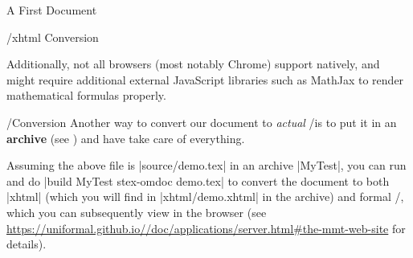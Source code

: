 \begin{sfragment}{A First \sTeX Document}
\begin{sfragment}{\omdoc/xhtml Conversion}
\begin{remark}
          Additionally, not all browsers (most notably Chrome)
          support \mathml natively, and might require
          additional external JavaScript libraries such as
          MathJax to render mathematical formulas properly.
      \end{remark}
    \end{sfragment}


    \begin{sfragment}{\mmt/\omdoc Conversion}
      Another way to convert our document to \emph{actual}
      \mmt/\omdoc is to put it in an \sTeX \textbf{archive} 
      (see ) and have \mmt take care of 
      everything.

      Assuming the above file is |source/demo.tex| in
      an \sTeX archive |MyTest|, you can run \mmt and
      do
      |build MyTest stex-omdoc demo.tex| to convert the
      document to both |xhtml| (which you will find in
      |xhtml/demo.xhtml| in the archive) and formal
      \mmt/\omdoc, which you can subsequently view in
      the \mmt browser (see \url{https://uniformal.github.io//doc/applications/server.html#the-mmt-web-site}
      for details).
    \end{sfragment}
\end{sfragment}


